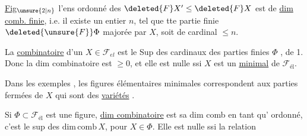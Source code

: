
\uline{Fig}$_{\unsure{2|n}}$   l'ens ordonné des $\deleted{F}X'\leq\deleted{F}X$ est de \uline{dim comb. finie}, i.e. il existe un entier $n$, tel que tte partie finie $\deleted{\unsure{F}}\Phi$  majorée par $X$,  soit de cardinal $\leq n$.

La \uline{} \uline{combinatoire} d'un $X\in\mathcal{F}_{el}$ est le Sup des cardinaux des parties finies $\Phi$ ,  de 1. Donc la dim combinatoire est $\geq 0$, et elle est nulle ssi $X$ est un \uline{} \uline{minimal} de $\mathcal{F}_{\text{él}}$.

Dans les exemples ,  les figures élémentaires minimales correspondent aux parties fermées de $X$ qui sont des \uline{variétés} \uline{}.

Si $\Phi\subset\mathcal{F}_{\text{él}}$ est une figure,  \uline{dim combinatoire} est sa dim comb en tant qu' ordonné, c'est  le sup des $\mathrm{dim\,comb}\,X$, pour $X\in\Phi$. Elle est nulle ssi   la relation
